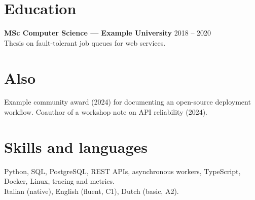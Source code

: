 \documentclass[10pt,a4paper]{article}
\begin{document}
\section*{Education}
\textbf{MSc Computer Science --- Example University} \hfill 2018 -- 2020\\
Thesis on fault-tolerant job queues for web services.

\section*{Also}
Example community award (2024) for documenting an open-source deployment
workflow. Coauthor of a workshop note on API reliability (2024).

\section*{Skills and languages}
Python, SQL, PostgreSQL, REST APIs, asynchronous workers, TypeScript, Docker,
Linux, tracing and metrics.\\
Italian (native), English (fluent, C1), Dutch (basic, A2).
\end{document}
